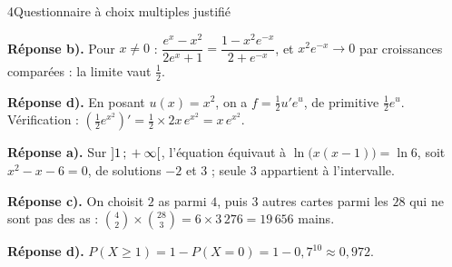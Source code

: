 

\begin{corrigeBac}{4}{Questionnaire à choix multiples justifié}
\begin{questions}
  \item \textbf{Réponse b).} Pour $x\neq0$ : $\dfrac{e^{x}-x^{2}}{2e^{x}+1}=\dfrac{1-x^{2}e^{-x}}{2+e^{-x}}$, et $x^{2}e^{-x}\to0$
    par croissances comparées : la limite vaut $\frac12$. \pts{1 pt}
  \item \textbf{Réponse d).} En posant $u(x)=x^{2}$, on a $f=\frac12u'e^{u}$, de primitive $\frac12e^{u}$. Vérification :
    $\left(\frac12e^{x^{2}}\right)'=\frac12\times2x\,e^{x^{2}}=x\,e^{x^{2}}$. 
  \item \textbf{Réponse a).} Sur $\mathopen{]}1\,{;}\,+\infty\mathclose{[}$, l'équation équivaut à $\ln\big(x(x-1)\big)=\ln6$, soit $x^{2}-x-6=0$, de
    solutions $-2$ et $3$ ; seule $3$ appartient à l'intervalle. 
  \item \textbf{Réponse c).} On choisit $2$ as parmi $4$, puis $3$ autres cartes parmi les $28$ qui ne sont pas des as :
    $\binom42\times\binom{28}{3}=6\times3\,276=19\,656$ mains. 
  \item \textbf{Réponse d).} $P(X\geq1)=1-P(X=0)=1-0{,}7^{10}\approx0{,}972$. 
\end{questions}
\end{corrigeBac}


